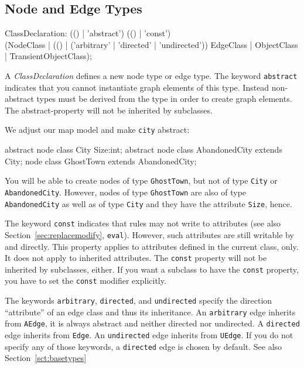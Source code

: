 \subsection{Node and Edge Types}\label{nodeandedgetypes}
\begin{rail}
  ClassDeclaration: (() | 'abstract') (() | 'const') \\
    (NodeClass | (() | ('arbitrary' | 'directed' | 'undirected')) EdgeClass | ObjectClass | TransientObjectClass);
\end{rail}
A \emph{ClassDeclaration} defines a new node type or edge type.
The keyword \texttt{abstract} indicates that you cannot instantiate graph elements of this type.
Instead non-abstract types must be derived from the type in order to create graph elements.
The abstract-property will not be inherited by subclasses.

\begin{example}
We adjust our map model and make \texttt{city} abstract:
\begin{grgen}
abstract node class City {
  Size:int;
}
abstract node class AbandonedCity extends City;
node class GhostTown extends AbandonedCity;
\end{grgen}
You will be able to create nodes of type \texttt{GhostTown}, but not of type \texttt{City} or \texttt{AbandonedCity}.
However, nodes of type \texttt{GhostTown} are also of type \texttt{AbandonedCity} as well as of type \texttt{City} and they have the attribute \texttt{Size}, hence.
\end{example}
The keyword \texttt{const} indicates that rules may not write to attributes (see also Section~\ref{sec:replacemodify}, \texttt{eval}).
However, such attributes are still writable by \LibGr{} and \GrShell{} directly. This property applies to attributes defined in the current class, only.
It does not apply to inherited attributes.
The \texttt{const} property will not be inherited by subclasses, either.
If you want a subclass to have the \texttt{const} property, you have to set the \texttt{const} modifier explicitly.

The keywords \texttt{arbitrary}, \texttt{directed}, and \texttt{undirected} specify the direction ``attribute'' of an edge class and thus its inheritance.
An \texttt{arbitrary} edge inherits from \texttt{AEdge}, it is always abstract and neither directed nor undirected.
A \texttt{directed} edge inherits from \texttt{Edge}.
An \texttt{undirected} edge inherits from \texttt{UEdge}.
If you do not specify any of those keywords, a \texttt{directed} edge is chosen by default.
See also Section~\ref{sct:basetypes}

